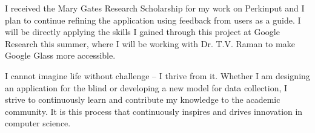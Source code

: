 I received the Mary Gates Research Scholarship for my work on Perkinput and I plan to continue refining the application using feedback from users as a guide. I will be directly applying the skills I gained through this project at Google Research this summer, where I will be working with Dr. T.V. Raman to make Google Glass more accessible.\vspace{3 mm}

I cannot imagine life without challenge – I thrive from it. Whether I am designing an application for the blind or developing a new model for data collection, I strive to continuously learn and contribute my knowledge to the academic community. It is this process that continuously inspires and drives innovation in computer science.\vspace{3 mm}

